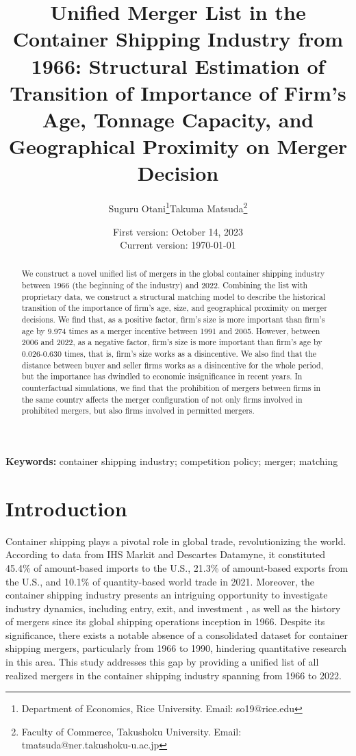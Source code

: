 \documentclass[10pt]{article}
\title{Unified Merger List in the Container Shipping Industry from 1966: Structural Estimation of Transition of Importance of Firm's Age, Tonnage Capacity, and Geographical Proximity on Merger Decision}
\author{Suguru Otani\thanks{Department of Economics, Rice University. Email: so19@rice.edu}\quad  Takuma Matsuda\thanks{Faculty of Commerce, Takushoku University. Email: tmatsuda@ner.takushoku-u.ac.jp}}
\date{
First version: October 14, 2023\\
Current version: \today
}
\begin{document}
\maketitle

\begin{abstract}
We construct a novel unified list of mergers in the global container shipping industry between 1966 (the beginning of the industry) and 2022. Combining the list with proprietary data, we construct a structural matching model to describe the historical transition of the importance of firm's age, size, and geographical proximity on merger decisions. 
We find that, as a positive factor, firm's size is more important than firm's age by 9.974 times as a merger incentive between 1991 and 2005.
However, between 2006 and 2022, as a negative factor, firm's size is more important than firm's age by 0.026-0.630 times, that is, firm's size works as a disincentive.
We also find that the distance between buyer and seller firms works as a disincentive for the whole period, but the importance has dwindled to economic insignificance in recent years. 
In counterfactual simulations, we find that the prohibition of mergers between firms in the same country affects the merger configuration of not only firms involved in prohibited mergers, but also firms involved in permitted mergers.
\end{abstract} 

\vspace{0.1in}
\noindent\textbf{Keywords:} container shipping industry; competition policy; merger; matching 
\vspace{0in}


\section{Introduction}

Container shipping plays a pivotal role in global trade, revolutionizing the world. According to data from IHS Markit and Descartes Datamyne, it constituted 45.4\% of amount-based imports to the U.S., 21.3\% of amount-based exports from the U.S., and 10.1\% of quantity-based world trade in 2021.
Moreover, the container shipping industry presents an intriguing opportunity to investigate industry dynamics, including entry, exit, and investment \citep{otani2023industry}, as well as the history of mergers since its global shipping operations inception in 1966.
Despite its significance, there exists a notable absence of a consolidated dataset for container shipping mergers, particularly from 1966 to 1990, hindering quantitative research in this area. 
This study addresses this gap by providing a unified list of all realized mergers in the container shipping industry spanning from 1966 to 2022.
\end{document}
